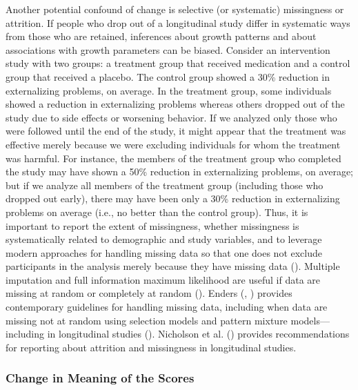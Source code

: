 \documentclass[
  american,
  letterpaper,
  12pt]{article}
\begin{document}
Another potential confound of change is selective (or systematic)
missingness or attrition. If people who drop out of a longitudinal study
differ in systematic ways from those who are retained, inferences about
growth patterns and about associations with growth parameters can be
biased. Consider an intervention study with two groups: a treatment
group that received medication and a control group that received a
placebo. The control group showed a 30\% reduction in externalizing
problems, on average. In the treatment group, some individuals showed a
reduction in externalizing problems whereas others dropped out of the
study due to side effects or worsening behavior. If we analyzed only
those who were followed until the end of the study, it might appear that
the treatment was effective merely because we were excluding individuals
for whom the treatment was harmful. For instance, the members of the
treatment group who completed the study may have shown a 50\% reduction
in externalizing problems, on average; but if we analyze all members of
the treatment group (including those who dropped out early), there may
have been only a 30\% reduction in externalizing problems on average
(i.e., no better than the control group). Thus, it is important to
report the extent of missingness, whether missingness is systematically
related to demographic and study variables, and to leverage modern
approaches for handling missing data so that one does not exclude
participants in the analysis merely because they have missing data
(). Multiple
imputation and full information maximum likelihood are useful if data
are missing at random or completely at random
(). Enders
(, )
provides contemporary guidelines for handling missing data, including
when data are missing not at random using selection models and pattern
mixture models---including in longitudinal studies
(). Nicholson et al.
() provides recommendations for
reporting about attrition and missingness in longitudinal studies.

\subsubsection{Change in Meaning of the
Scores}\label{change-in-meaning-of-the-scores}
\end{document}
